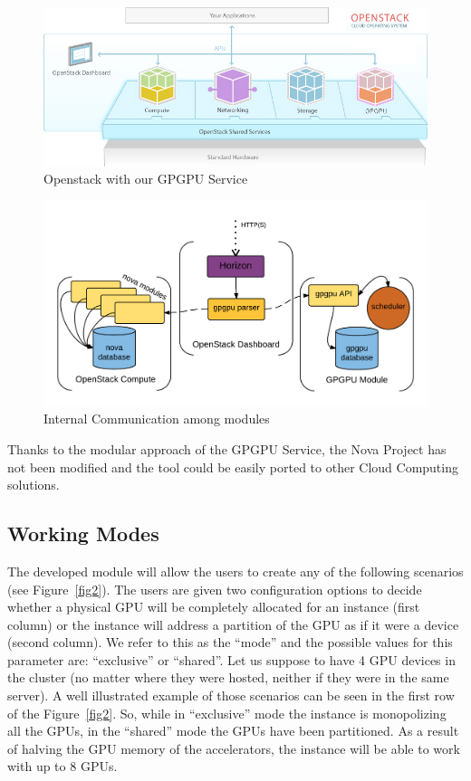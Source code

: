 \documentclass[a4paper,twoside]{article}
\begin{document}
\begin{figure}[htb]
  \centering
  \includegraphics[width=\linewidth]{images/os1.jpg}
  \caption{Openstack with our GPGPU Service}
  \label{fig:external}
\end{figure}

\begin{figure}[htb]
  \centering
  \includegraphics[width=\linewidth]{images/os2.png}
  \caption{Internal Communication among modules}
  \label{fig:internal}
\end{figure}

Thanks to the modular approach of the GPGPU Service, the Nova Project has not been modified and the tool could be easily ported to other Cloud Computing solutions.

\subsection{Working Modes}
The developed module will allow the users to create any of the following scenarios (see Figure~\ref{fig2}). 
The users are given two configuration options to decide whether a physical GPU will be completely allocated for an instance (first column) or the instance will address a partition of the GPU as if it were a device (second column).
We refer to this as the ``mode'' and the possible values for this parameter are: ``exclusive'' or ``shared''. 
Let us suppose to have 4 GPU devices in the cluster (no matter where they were hosted, neither if they were in the same server). 
A well illustrated example of those scenarios can be seen in the first row of the  Figure~\ref{fig2}.
So, while in ``exclusive'' mode the instance is monopolizing all the GPUs, in the ``shared'' mode the GPUs have been partitioned. 
As a result of halving the GPU memory of the accelerators, the instance will be able to work with up to 8 GPUs.
\end{document}
